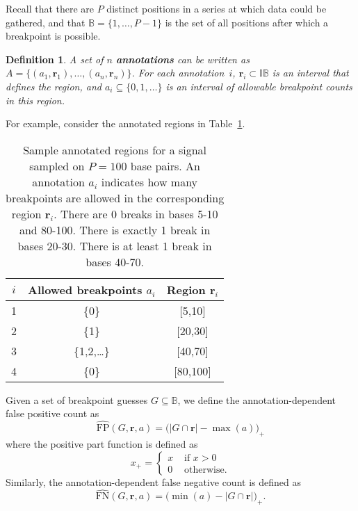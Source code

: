 \documentclass{article}
\newtheorem{definition}{Definition}
\renewcommand{\r}{ \mathbf{ r} }
\begin{document}

Recall that there are $P$ distinct positions in a series at which data
could be gathered, 
and that $\mathbb B=\{1,\dots,P-1\}$ is the set of all
positions after which a breakpoint is possible.

\begin{definition}
  A set of $n$ \textbf{annotations} can be written as $A=\{(a_1,
  \r_1), \dots, (a_n, \r_n)\}$. For each annotation~$i$,
  $\r_i\subset\mathbb I\mathbb B$ is an interval that defines the
  region, and $a_i\subseteq\{0,1,\dots\}$ is an interval of allowable
  breakpoint counts in this region.
\end{definition}

For
example, consider the annotated regions in
Table~\ref{tab:sample_annotations}.

\begin{table}[H]
  \begin{center}
    \begin{tabular}{ccc}
  $i$ & Allowed breakpoints $a_i$ & Region $\r_i$\\
\hline
1 & \{0\} & [5,10]\\
2 & \{1\} & [20,30]\\
3 & \{1,2,\dots\} & [40,70]\\
4 & \{0\} & [80,100]
\end{tabular}
  \end{center}
  \caption{Sample annotated regions for a signal sampled on $P=100$ base pairs. 
    An annotation $a_i$ indicates how many breakpoints are allowed in the
    corresponding region $\r_i$.
    There are 0 breaks in bases 5-10 and 80-100.
    There is exactly 1 break in bases 20-30.
    There is at least 1 break in bases 40-70.}
  \label{tab:sample_annotations}
\end{table}

Given a set of breakpoint guesses $G\subseteq \mathbb B$, we define
the annotation-dependent false positive count as
\begin{equation}
  \label{eq:FP_hat}
  \hat{ \text{FP}}(G,\r,a) =
    \big( 
|G\cap\r|-\max(a)
\big)_+
\end{equation}
where the positive part function is defined as
\begin{equation}
x_+ =
  \begin{cases}
    x & \text{ if } x > 0 \\
    0 & \text{ otherwise.}
  \end{cases}
\end{equation}
Similarly, the annotation-dependent false negative count is defined as
\begin{equation}
  \label{eq:FN_hat}
  \hat{ \text{FN}}(G,\r,a) =
  \big(
\min(a)-|G\cap\r|
\big)_+.
\end{equation}
\end{document}

